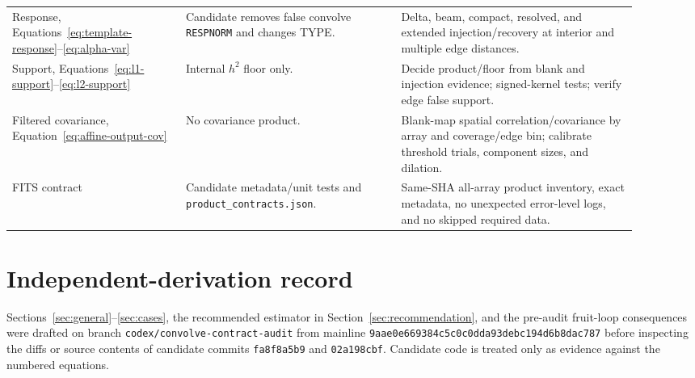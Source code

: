 \documentclass[11pt]{article}
\newcommand{\code}[1]{\nolinkurl{#1}}
\begin{document}
\begin{longtable}{L{0.25\linewidth}L{0.31\linewidth}L{0.34\linewidth}}
Response, Equations~\eqref{eq:template-response}--\eqref{eq:alpha-var} & Candidate removes false convolve \code{RESPNORM} and changes TYPE. & Delta, beam, compact, resolved, and extended injection/recovery at interior and multiple edge distances.\\
Support, Equations~\eqref{eq:l1-support}--\eqref{eq:l2-support} & Internal $h^2$ floor only. & Decide product/floor from blank and injection evidence; signed-kernel tests; verify edge false support.\\
Filtered covariance, Equation~\eqref{eq:affine-output-cov} & No covariance product. & Blank-map spatial correlation/covariance by array and coverage/edge bin; calibrate threshold trials, component sizes, and dilation.\\
FITS contract & Candidate metadata/unit tests and \code{product_contracts.json}. & Same-SHA all-array product inventory, exact metadata, no unexpected error-level logs, and no skipped required data.\\
\bottomrule
\end{longtable}
\normalsize

\section{Independent-derivation record}
\label{app:independence}

Sections~\ref{sec:general}--\ref{sec:cases}, the recommended estimator in
Section~\ref{sec:recommendation}, and the pre-audit fruit-loop consequences
were drafted on branch \code{codex/convolve-contract-audit} from mainline
\code{9aae0e669384c5c0c0dda93debc194d6b8dac787} before inspecting the diffs or
source contents of candidate commits \code{fa8f8a5b9} and
\code{02a198cbf}.  Candidate code is treated only as evidence against the
numbered equations.
\end{document}
